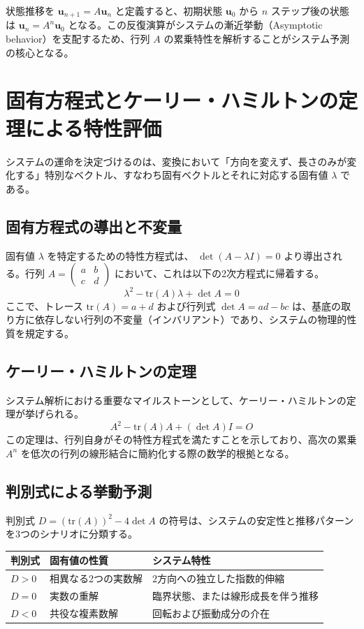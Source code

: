 ﻿\documentclass[12pt]{bxjsarticle}
\begin{document}
状態推移を  $\mathbf{u}_{n+1} = A\mathbf{u}_n$  と定義すると、初期状態  $\mathbf{u}_0$  から  $n$  ステップ後の状態は  $\mathbf{u}_n = A^n \mathbf{u}_0$  となる。この反復演算がシステムの漸近挙動（Asymptotic behavior）を支配するため、行列  $A$  の累乗特性を解析することがシステム予測の核心となる。

\section{固有方程式とケーリー・ハミルトンの定理による特性評価}

システムの運命を決定づけるのは、変換において「方向を変えず、長さのみが変化する」特別なベクトル、すなわち固有ベクトルとそれに対応する固有値  $\lambda$  である。

\subsection{固有方程式の導出と不変量}

固有値  $\lambda$  を特定するための特性方程式は、 $\det(A - \lambda I) = 0$  より導出される。行列  $A = \begin{pmatrix} a & b \\ c & d \end{pmatrix}$  において、これは以下の2次方程式に帰着する。  $$\lambda^2 - \text{tr}(A)\lambda + \det A = 0$$  ここで、トレース  $\text{tr}(A) = a + d$  および行列式  $\det A = ad - bc$  は、基底の取り方に依存しない行列の不変量（インバリアント）であり、システムの物理的性質を規定する。

\subsection{ケーリー・ハミルトンの定理}

システム解析における重要なマイルストーンとして、ケーリー・ハミルトンの定理が挙げられる。  $$A^2 - \text{tr}(A)A + (\det A)I = O$$  この定理は、行列自身がその特性方程式を満たすことを示しており、高次の累乗  $A^n$  を低次の行列の線形結合に簡約化する際の数学的根拠となる。

\subsection{判別式による挙動予測}

判別式  $D = (\text{tr}(A))^2 - 4\det A$  の符号は、システムの安定性と推移パターンを3つのシナリオに分類する。

\begin{center}
\begin{tabular}{lll}
\toprule
判別式 & 固有値の性質 & システム特性 \\
\midrule
$D > 0$ & 相異なる2つの実数解 & 2方向への独立した指数的伸縮 \\
$D = 0$ & 実数の重解 & 臨界状態、または線形成長を伴う推移 \\
$D < 0$ & 共役な複素数解 & 回転および振動成分の介在 \\
\bottomrule
\end{tabular}
\end{center}
\end{document}
